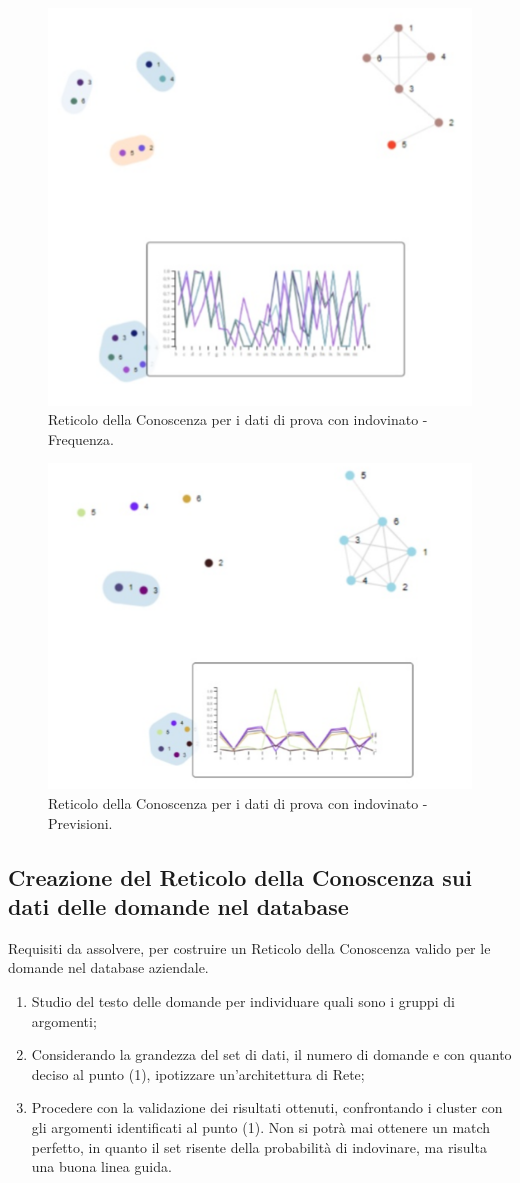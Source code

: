 \begin{figure}[H]
\centering
	\includegraphics[width=0.60\linewidth]{./image/collage_reticolo-probability-FREQ.png}
	\caption{Reticolo della Conoscenza per i dati di prova con indovinato - Frequenza.}
	\label{Reticolo della Conoscenza per i dati di prova con indovinato - Frequenza.}
\end{figure}
\noindent
\begin{figure}[H]
\centering
	\includegraphics[width=0.60\linewidth]{./image/collage_reticolo-probability.png}
	\caption{Reticolo della Conoscenza per i dati di prova con indovinato - Previsioni.}
	\label{Reticolo della Conoscenza per i dati di prova con indovinato - Previsioni.}
\end{figure}
\noindent


\subsection{Creazione del Reticolo della Conoscenza sui dati delle domande nel database}
\label{Creazione del Reticolo della Conoscenza sui dati delle domande nel database}

Requisiti da assolvere, per costruire un Reticolo della Conoscenza valido per le domande nel database aziendale.
\begin{enumerate}
\item Studio del testo delle domande per individuare quali sono i gruppi di argomenti;
\item Considerando la grandezza del set di dati, il numero di domande e con quanto deciso al punto (1), ipotizzare un'architettura di Rete;
\item Procedere con la validazione dei risultati ottenuti, confrontando i cluster con gli argomenti identificati al punto (1). Non si potrà mai ottenere un match perfetto, in quanto il set risente della probabilità di indovinare, ma risulta una buona linea guida.
\end{enumerate}


